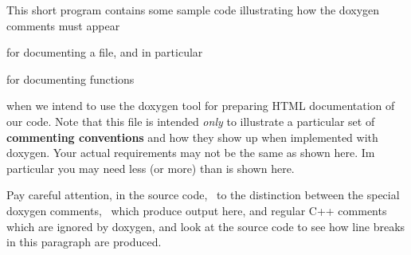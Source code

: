 This short program contains some sample code illustrating how the doxygen comments must appear
\begin{DoxyItemize}
\item for documenting a file, and in particular
\item for documenting functions
\end{DoxyItemize}when we intend to use the doxygen tool for preparing H\+T\+ML documentation of our code. Note that this file is intended {\itshape only} to illustrate a particular set of {\bfseries{commenting conventions}} and how they show up when implemented with doxygen. Your actual requirements may not be the same as shown here. Im particular you may need less (or more) than is shown here.

Pay careful attention, in the source code,~\newline
 to the distinction between the special doxygen comments,~\newline
which produce output here, and regular C++ comments which are ignored by doxygen, and look at the source code to see how line breaks in this paragraph are produced. 